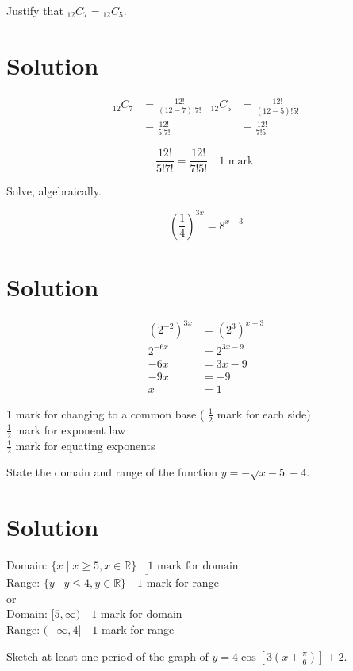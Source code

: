 \documentclass[10pt]{article}
\begin{document}
Justify that ${ }_{12} C_{7}={ }_{12} C_{5}$.

\section*{Solution}
$$
\begin{aligned}
{ }_{12} C_{7} & =\frac{12!}{(12-7)!7!} & { }_{12} C_{5} & =\frac{12!}{(12-5)!5!} \\
& =\frac{12!}{5!7!} & & =\frac{12!}{7!5!}
\end{aligned}
$$

$$
\frac{12!}{5!7!}=\frac{12!}{7!5!} \quad 1 \text { mark }
$$

Solve, algebraically.

$$
\left(\frac{1}{4}\right)^{3 x}=8^{x-3}
$$

\section*{Solution}
$$
\begin{aligned}
\left(2^{-2}\right)^{3 x} & =\left(2^{3}\right)^{x-3} \\
2^{-6 x} & =2^{3 x-9} \\
-6 x & =3 x-9 \\
-9 x & =-9 \\
x & =1
\end{aligned}
$$

1 mark for changing to a common base ( $\frac{1}{2}$ mark for each side)\\
$\frac{1}{2}$ mark for exponent law\\
$\frac{1}{2}$ mark for equating exponents

State the domain and range of the function $y=-\sqrt{x-5}+4$.

\section*{Solution}
Domain: $\underline{\{x \mid x \geq 5, x \in \mathbb{R}\} \quad 1 \text { mark for domain }}$\\
Range: $\{y \mid y \leq 4, y \in \mathbb{R}\} \quad 1$ mark for range\\
or\\
Domain: $[5, \infty) \quad 1$ mark for domain\\
Range: $(-\infty, 4] \quad 1$ mark for range

Sketch at least one period of the graph of $y=4 \cos \left[3\left(x+\frac{\pi}{6}\right)\right]+2$.
\end{document}
